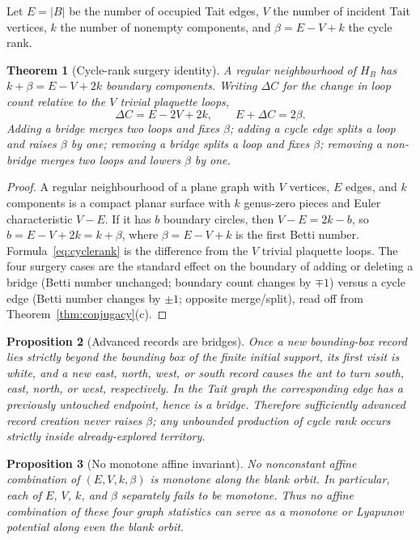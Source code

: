 \documentclass[11pt,reqno]{amsart}
\theoremstyle{plain}
\newtheorem{theorem}{Theorem}[section]
\newtheorem{proposition}[theorem]{Proposition}
\theoremstyle{definition}
\begin{document}
Let $E=|B|$ be the number of occupied Tait edges, $V$ the number of incident Tait
vertices, $k$ the number of nonempty components, and $\beta=E-V+k$ the cycle rank.

\begin{theorem}[Cycle-rank surgery identity]\label{thm:cyclerank}
A regular neighbourhood of $H_B$ has $k+\beta=E-V+2k$ boundary components. Writing
$\Delta C$ for the change in loop count relative to the $V$ trivial plaquette loops,
\begin{equation}\label{eq:cyclerank}
\Delta C=E-2V+2k,\qquad E+\Delta C=2\beta .
\end{equation}
Adding a bridge merges two loops and fixes $\beta$; adding a cycle edge splits a loop
and raises $\beta$ by one; removing a bridge splits a loop and fixes $\beta$;
removing a non-bridge merges two loops and lowers $\beta$ by one.
\end{theorem}

\begin{proof}
A regular neighbourhood of a plane graph with $V$ vertices, $E$ edges, and $k$
components is a compact planar surface with $k$ genus-zero pieces and Euler
characteristic $V-E$. If it has $b$ boundary circles, then $V-E=2k-b$, so
$b=E-V+2k=k+\beta$, where $\beta=E-V+k$ is the first Betti number.
Formula~\eqref{eq:cyclerank} is the difference from the $V$ trivial plaquette loops.
The four surgery cases are the standard effect on the boundary of adding or deleting
a bridge (Betti number unchanged; boundary count changes by $\mp1$) versus a cycle
edge (Betti number changes by $\pm1$; opposite merge/split), read off from
Theorem~\ref{thm:conjugacy}(c).
\end{proof}

\begin{proposition}[Advanced records are bridges]\label{prop:record}
Once a new bounding-box record lies strictly beyond the bounding box of the finite
initial support, its first visit is white, and a new east, north, west, or south
record causes the ant to turn south, east, north, or west, respectively. In the
Tait graph the corresponding edge has a previously untouched endpoint, hence is a
bridge. Therefore sufficiently advanced record creation never raises $\beta$; any
unbounded production of cycle rank occurs strictly inside already-explored territory.
\end{proposition}

\begin{proposition}[No monotone affine invariant]\label{rem:nomonotone}
No nonconstant affine combination of $(E,V,k,\beta)$ is monotone along the blank
orbit. In particular, each of $E$, $V$, $k$, and $\beta$ separately fails to be
monotone. Thus no affine combination of these four graph statistics can serve as a
monotone or Lyapunov potential along even the blank orbit.
\end{proposition}
\end{document}
